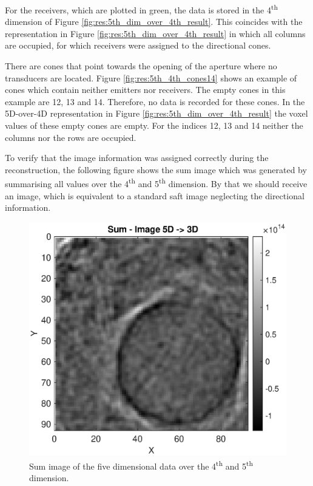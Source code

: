 For the receivers, which are plotted in green, the data is stored in the 4\textsuperscript{th} dimension of Figure \ref{fig:res:5th_dim_over_4th_result}. This coincides with the representation in Figure \ref{fig:res:5th_dim_over_4th_result} in which all columns are occupied, for which receivers were assigned to the directional cones. 

There are cones that point towards the opening of the aperture where no transducers are located. Figure \ref{fig:res:5th_4th_cones14} shows an example of cones which contain neither emitters nor receivers. The empty cones in this example are 12, 13 and 14. Therefore, no data is recorded for these cones. In the 5D-over-4D representation in Figure \ref{fig:res:5th_dim_over_4th_result} the voxel values of these empty cones are empty. For the indices 12, 13 and 14 neither the columns nor the rows are occupied.

\bigskip

To verify that the image information was assigned correctly during the reconstruction, the following figure shows the sum image which was generated by summarising all values over the 4\textsuperscript{th} and 5\textsuperscript{th} dimension. By that we should receive an image, which is equivalent to a standard \ac{saft} image neglecting the directional information.


\begin{figure}[H]
    \centering
    \includegraphics[width=0.69\linewidth]{Graphics/sum_image_35_vec_to_show_that_assign_works.eps}
    \caption{Sum image of the five dimensional data over the 4\textsuperscript{th} and 5\textsuperscript{th} dimension. }
    \label{fig:res:sum_image_35_vec_to_show_that_assign_works}
\end{figure}

